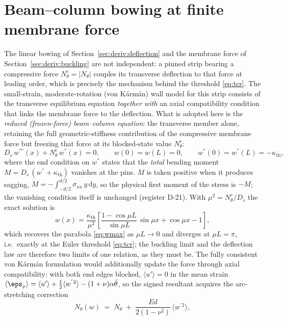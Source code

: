 \section{Beam--column bowing at finite membrane force}
\label{sec:deriv:beamcolumn}
The linear bowing of Section~\ref{sec:deriv:deflection} and the membrane force of
Section~\ref{sec:deriv:buckling} are not independent: a pinned strip bearing a compressive
force $N_\theta^c=|N_\theta|$ couples its transverse deflection to that force at leading order,
which is precisely the mechanism behind the threshold \eqref{eq:tcr}. The small-strain,
moderate-rotation (von K\'arm\'an) wall model for this strip consists of the transverse
equilibrium equation \emph{together with} an axial compatibility condition that links the
membrane force to the deflection. What is adopted here is the \emph{reduced (frozen-force)
beam--column equation}: the transverse member alone, retaining the full geometric-stiffness
contribution of the compressive membrane force but freezing that force at its blocked-state
value $N_\theta^c$:
\begin{equation}
D_s\,w^{''''}(x)+N_\theta^c\,w^{''}(x)=0,
\qquad
w(0)=w(L)=0,\qquad
w^{''}(0)=w^{''}(L)=-\kappa_{\mathrm{th}},
\label{eq:beamcol}
\end{equation}
where the end condition on $w^{''}$ states that the \emph{total} bending moment
$M=D_s\,(w^{''}+\kappa_{\mathrm{th}})$ vanishes at the pins. $M$ is taken positive when it produces
sagging, $M=-\int_{-d/2}^{d/2}\sigma_{xx}\,y\,\mathrm dy$, so the physical first moment of the stress
is $-M$; the vanishing condition itself is unchanged (register D-21). With $\mu^2=N_\theta^c/D_s$ the
exact solution is
\begin{equation}
w(x)=\frac{\kappa_{\mathrm{th}}}{\mu^2}
\left[\frac{1-\cos\mu L}{\sin\mu L}\,\sin\mu x+\cos\mu x-1\right],
\label{eq:beamcolsol}
\end{equation}
which recovers the parabola \eqref{eq:wmax} as $\mu L\to0$ and diverges at $\mu L=\pi$, i.e.\
exactly at the Euler threshold \eqref{eq:tcr}; the buckling limit and the deflection law are
therefore two limits of one relation, as they must be. The fully consistent von K\'arm\'an
formulation would additionally update the force through axial compatibility: with both end
edges blocked, $\langle u'\rangle=0$ in the mean strain
$\langle\eps_x\rangle=\langle u'\rangle+\tfrac12\langle w^{'}{}^2\rangle-(1+\nu)\alpha\bar\theta$,
so the signed resultant acquires the arc-stretching correction
\begin{equation}
N_\theta(w)\;=\;N_\theta\;+\;\frac{Ed}{2(1-\nu^2)}\,\langle w^{'}{}^2\rangle ,
\label{eq:nupdate}
\end{equation}
